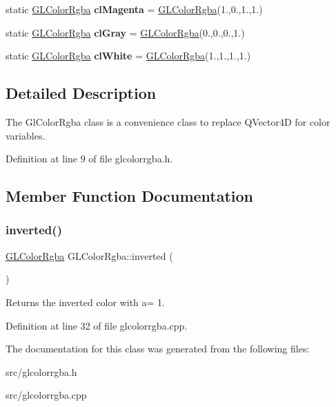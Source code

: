 \begin{DoxyCompactItemize}
static \mbox{\hyperlink{class_g_l_color_rgba}{G\+L\+Color\+Rgba}} {\bfseries cl\+Magenta} = \mbox{\hyperlink{class_g_l_color_rgba}{G\+L\+Color\+Rgba}}(1.,0.,1.,1.)
\item 
\mbox{\label{class_g_l_color_rgba_ac017bac6b8a0c5318a32277a9f8fa2b9}} 
static \mbox{\hyperlink{class_g_l_color_rgba}{G\+L\+Color\+Rgba}} {\bfseries cl\+Gray} = \mbox{\hyperlink{class_g_l_color_rgba}{G\+L\+Color\+Rgba}}(0.,0.,0.,1.)
\item 
\mbox{\label{class_g_l_color_rgba_a71745b9d605d383870b32d83c79908dd}} 
static \mbox{\hyperlink{class_g_l_color_rgba}{G\+L\+Color\+Rgba}} {\bfseries cl\+White} = \mbox{\hyperlink{class_g_l_color_rgba}{G\+L\+Color\+Rgba}}(1.,1.,1.,1.)
\end{DoxyCompactItemize}


\subsection{Detailed Description}
The Gl\+Color\+Rgba class is a convenience class to replace Q\+Vector4D for color variables. 

Definition at line 9 of file glcolorrgba.\+h.



\subsection{Member Function Documentation}
\mbox{\label{class_g_l_color_rgba_aebd1534aa7987e20cf5bf610a30c812c}} 
\subsubsection{\texorpdfstring{inverted()}{inverted()}}
{\footnotesize\ttfamily \mbox{\hyperlink{class_g_l_color_rgba}{G\+L\+Color\+Rgba}} G\+L\+Color\+Rgba\+::inverted (\begin{DoxyParamCaption}{ }\end{DoxyParamCaption})}

Returns the inverted color with a= 1. 

Definition at line 32 of file glcolorrgba.\+cpp.



The documentation for this class was generated from the following files\+:\begin{DoxyCompactItemize}
\item 
src/glcolorrgba.\+h\item 
src/glcolorrgba.\+cpp\end{DoxyCompactItemize}
